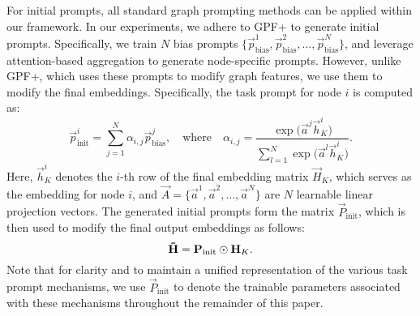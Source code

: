 \label{sec.prompt-tuning}
For initial prompts, all standard graph prompting methods can be applied within our framework. In our experiments, we adhere to GPF+ \cite{fang2024universal} to generate initial prompts. Specifically, we train \( N \) bias prompts $\{\vec{p}_\text{bias}^1, \vec{p}_\text{bias}^2, \ldots, \vec{p}_\text{bias}^N\}$, 
and leverage attention-based aggregation to generate node-specific prompts. However, unlike GPF+, which uses these prompts to modify graph features, we use them to modify the final embeddings. Specifically, the task prompt for node \( i \) is computed as:
\begin{equation}
    \vec{p}_\text{init}^i = \sum_{j=1}^{N} \alpha_{i,j} \vec{p}_\text{bias}^j,\quad \text{where} \quad \alpha_{i,j} = \frac{\exp\big(\vec{a}^{j}\vec{h}_{K}^i\big)}{\sum_{l=1}^{N} \exp\big(\vec{a}^{l}\vec{h}_{K}^i\big)}.
\end{equation}
Here, \( \vec{h}_{K}^i \) denotes the \( i \)-th row of the final embedding matrix \( \vec{H}_{K} \), which serves as the embedding for node \( i \), and \(\vec{A}= \{\vec{a}^1, \vec{a}^2, \ldots, \vec{a}^N\} \) are \( N \) learnable linear projection vectors. The generated initial prompts form the matrix \( \vec{P}_\text{init} \), which is then used to modify the final output embeddings as follows:
\begin{equation}\label{eq.initial-prompt}
    \vec{\Tilde{H}} = \vec{P}_\text{init} \odot \vec{H}_{K}.
\end{equation}
Note that for clarity and to maintain a unified representation of the various task prompt mechanisms, we use \(\vec{P}_\text{init}\) to denote the trainable parameters associated with these mechanisms throughout the remainder of this paper.


